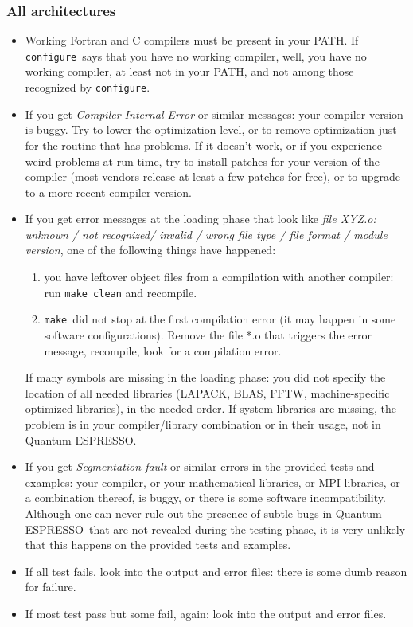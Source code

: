 \documentclass[12pt,a4paper]{article}
\def\qe{{\sc Quantum ESPRESSO}}
\def\configure{\texttt{configure}}
\def\make{\texttt{make}}
\begin{document}
\subsubsection{All architectures}
\begin{itemize}
\item
Working Fortran and C compilers must be present in your PATH.
If \configure\ says that you have no working compiler, well,
you have no working compiler, at least not in your PATH, and
not among those recognized by \configure.
\item
If you get {\em Compiler Internal Error} or similar messages: your
compiler version is buggy. Try to lower the optimization level, or to
remove optimization just for the routine that has problems. If it
doesn't work, or if you experience weird problems at run time, try to
install patches for your version of the compiler (most vendors release
at least a few patches for free), or to upgrade to a more recent
compiler version.
\item
If you get error messages at the loading phase that look like
{\em file XYZ.o: unknown / not recognized/ invalid / wrong
file type / file format / module version},
one of the following things have happened:
\begin{enumerate}
\item you have leftover object files from a compilation with another
  compiler: run \texttt{make clean} and recompile.
\item \make\ did not stop at the first compilation error (it may
happen in some software configurations). Remove the file *.o
that triggers the error message, recompile, look for a
compilation error.
\end{enumerate}
If many symbols are missing in the loading phase: you did not specify the
location of all needed libraries (LAPACK, BLAS, FFTW, machine-specific
optimized libraries), in the needed order. If system libraries are missing, 
the problem is in your compiler/library combination or in their usage, not 
in \qe.
\item
If you get {\em Segmentation fault} or similar errors
in the provided tests and examples: your compiler, or
your mathematical libraries, or MPI libraries,
or a combination thereof, is buggy, or there is some
software incompatibility. Although one can never rule out
the presence of subtle bugs in \qe\ that are not revealed during
the testing phase, it is very unlikely
that this happens on the provided tests and examples.
\item
If all test fails, look into the output and error files:
there is some dumb reason for failure.
\item
If most test pass but some fail, again: look into the output
and error files.
\end{itemize}
\end{document}
